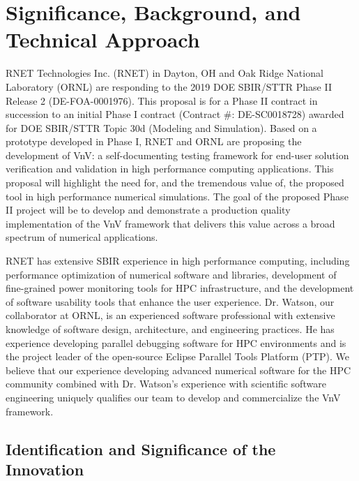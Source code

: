 \section{Significance, Background, and Technical Approach}

RNET Technologies Inc. (RNET) in Dayton, OH and Oak Ridge National Laboratory 
(ORNL) are responding to the 2019 DOE SBIR/STTR Phase II Release 2 
(DE-FOA-0001976). This proposal is for a Phase II contract in succession to an 
initial Phase I contract (Contract \#: DE-SC0018728) awarded for DOE 
SBIR/STTR Topic 30d (Modeling and Simulation). Based on a prototype developed in Phase I, RNET and ORNL are proposing the development of VnV: a self-documenting testing framework for end-user solution verification and validation in high performance computing applications. This proposal will highlight the need for, and the tremendous value of, the proposed tool in high performance numerical simulations. The goal of the proposed Phase II project will be to develop and demonstrate a production quality implementation of the VnV framework that delivers this value across a broad spectrum of numerical applications. 

RNET has extensive SBIR experience in high performance computing, including performance optimization of numerical software and libraries, development of fine-grained power monitoring tools for HPC infrastructure, and the development of software usability tools that enhance the user experience. Dr. Watson, our collaborator at ORNL, is an experienced software professional with extensive knowledge of software design, architecture, and engineering practices. He has experience developing parallel debugging software for HPC environments and  is the project leader of the open-source Eclipse Parallel Tools Platform (PTP). We believe that our experience developing advanced numerical software for the HPC community combined with Dr. Watson's experience with scientific software engineering uniquely qualifies our team to develop and commercialize the VnV framework.

\subsection{Identification and Significance of the Innovation}
\label{sec:identification}


